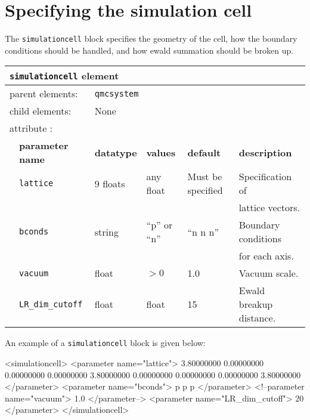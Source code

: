\section{Specifying the simulation cell}
\label{chap:simulationcell}

The \texttt{simulationcell} block specifies the geometry of the cell, how the boundary conditions should be handled, and how ewald summation should be broken up.

\begin{table}[h]
\begin{center}
\begin{tabularx}{\textwidth}{l l l l l l }
\hline
\multicolumn{6}{l}{\texttt{simulationcell} element} \\
\hline
\multicolumn{2}{l}{parent elements:} & \multicolumn{4}{l}{\texttt{qmcsystem}}\\
\multicolumn{2}{l}{child  elements:} & \multicolumn{4}{l}{None}\\
\multicolumn{2}{l}{attribute      :} & \multicolumn{4}{l}{}\\
   &   \bfseries parameter name            & \bfseries datatype & \bfseries values & \bfseries default   & \bfseries description \\
\hline
   &   \texttt{lattice}  & 9 floats & any float & Must be specified & Specification of \\
   &                     &        &             &                   & lattice vectors. \\
   &   \texttt{bconds}   & string & ``p'' or ``n''  & ``n n n'' & Boundary conditions \\
   &                     &        &             &           & for each axis. \\
   &   \texttt{vacuum} & float & $>0$ & 1.0        & Vacuum scale. \\
   &   \texttt{LR\_dim\_cutoff} & float & float & 15        & Ewald breakup distance. \\
\hline
\end{tabularx}
\end{center}
\end{table}

An example of a \texttt{simulationcell} block is given below:
\begin{shade}
  <simulationcell>
    <parameter name="lattice">
      3.80000000       0.00000000       0.00000000
      0.00000000       3.80000000       0.00000000
      0.00000000       0.00000000       3.80000000
    </parameter>
    <parameter name="bconds">
       p p p
    </parameter>
    <!--parameter name="vacuum"> 1.0 </parameter-->
    <parameter name="LR_dim_cutoff"> 20 </parameter>
  </simulationcell>
\end{shade}

